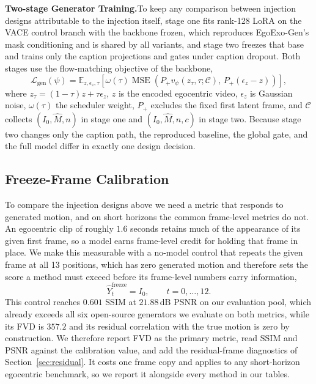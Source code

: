 \documentclass{article}
\begin{document}
\textbf{Two-stage Generator Training.}\quad To keep any comparison between
injection designs attributable to the injection itself, stage one fits rank-128
LoRA on the VACE control branch with the backbone frozen, which reproduces
EgoExo-Gen's mask conditioning and is shared by all variants, and stage two
freezes that base and trains only the caption projections and gates under caption
dropout. Both stages use the flow-matching objective of the backbone,
\begin{equation}
\mathcal{L}_{\mathrm{gen}}(\psi)=\mathbb{E}_{z,\epsilon_z,\tau}\left[
\omega(\tau)\operatorname{MSE}\!\left(P_{+}v_\psi(z_\tau,\tau;\mathcal{C}),\,
P_{+}(\epsilon_z-z)\right)\right],
\label{eq:flow}
\end{equation}
where $z_\tau=(1-\tau)z+\tau\epsilon_z$, $z$ is the encoded egocentric video,
$\epsilon_z$ is Gaussian noise, $\omega(\tau)$ the scheduler weight, $P_{+}$
excludes the fixed first latent frame, and $\mathcal{C}$ collects
$(I_0,\widehat{M},n)$ in stage one and $(I_0,\widehat{M},n,c)$ in stage two.
Because stage two changes only the caption path, the reproduced baseline, the
global gate, and the full model differ in exactly one design decision.

\subsection{Freeze-Frame Calibration}
\label{sec:freeze}

To compare the injection designs above we need a metric that responds to
generated motion, and on short horizons the common frame-level metrics do
not. An egocentric clip of roughly $1.6$ seconds retains much of the appearance of its
given first frame, so a model earns frame-level credit for holding that frame in
place. We make this measurable with a no-model control that repeats the given
frame at all 13 positions, which has zero generated motion and therefore sets the
score a method must exceed before its frame-level numbers carry information,
\begin{equation}
\widehat{Y}^{\mathrm{freeze}}_t = I_0, \qquad t=0,\dots,12 .
\label{eq:freeze}
\end{equation}
This control reaches $0.601$ SSIM at $21.88$\,dB PSNR on our evaluation pool,
which already exceeds all six open-source generators we evaluate on both metrics,
while its FVD is $357.2$ and its residual correlation with the true motion is
zero by construction. We therefore report FVD as the primary metric, read SSIM and PSNR against the
calibration value, and add the residual-frame diagnostics of
Section~\ref{sec:residual}. It costs one frame copy and applies to any short-horizon
egocentric benchmark, so we report it alongside every method in our tables.
\end{document}
